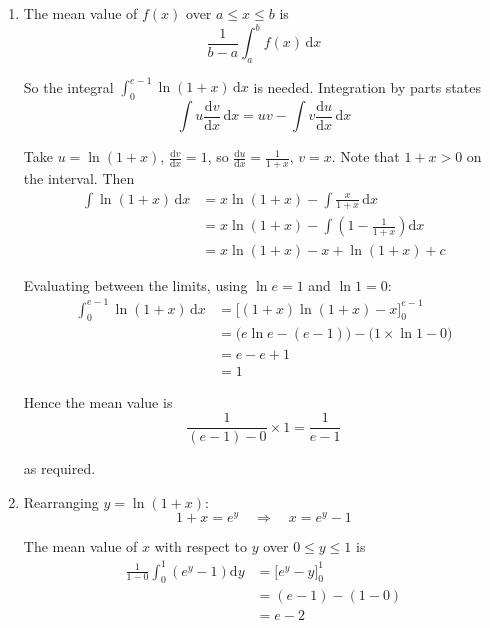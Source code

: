 \documentclass[leqno]{article}
\begin{document}
\begin{enumerate}[
  label=\textbf{\arabic*.},
  leftmargin=*,
  topsep=0pt,
  partopsep=0pt,
  parsep=0pt
]
\vspace*{10pt}

\begin{djsSolution}
\begin{enumerate}[label=\textbf{(\alph*)}, start=1]
  \item The mean value of \(f(x)\) over \(a\le x\le b\) is
\[
\dfrac{1}{b-a}\int_a^b f(x)\,\mathrm{d}x
\]

So the integral \(\int_0^{e-1}\ln(1+x)\,\mathrm{d}x\) is needed. Integration by parts states
\[
\displaystyle\int u\frac{\mathrm{d}v}{\mathrm{d}x}\,\mathrm{d}x = uv - \int v\frac{\mathrm{d}u}{\mathrm{d}x}\,\mathrm{d}x
\]

Take \(u=\ln(1+x)\), \(\frac{\mathrm{d}v}{\mathrm{d}x}=1\), so \(\frac{\mathrm{d}u}{\mathrm{d}x}=\frac{1}{1+x}\), \(v=x\). Note that \(1+x>0\) on the interval. Then
\begin{align*}
\int \ln(1+x)\,\mathrm{d}x &= x\ln(1+x)-\int\frac{x}{1+x}\,\mathrm{d}x\\
&= x\ln(1+x)-\int\left(1-\frac{1}{1+x}\right)\mathrm{d}x\\
&= x\ln(1+x)-x+\ln(1+x)+c
\end{align*}

Evaluating between the limits, using \(\ln e=1\) and \(\ln 1=0\):
\begin{align*}
\int_0^{e-1}\ln(1+x)\,\mathrm{d}x &= \Big[(1+x)\ln(1+x)-x\Big]_0^{e-1}\\
&= \big(e\ln e-(e-1)\big)-\big(1\times\ln 1-0\big)\\
&= e-e+1\\
&= 1
\end{align*}

Hence the mean value is
\[
\frac{1}{(e-1)-0}\times 1=\frac{1}{e-1}
\]

as required.

  \item Rearranging \(y=\ln(1+x)\):
\[
1+x=e^{y}\quad\Longrightarrow\quad x=e^{y}-1
\]

The mean value of \(x\) with respect to \(y\) over \(0\le y\le 1\) is
\begin{align*}
\frac{1}{1-0}\int_0^1\left(e^{y}-1\right)\mathrm{d}y &= \Big[e^{y}-y\Big]_0^1\\
&= (e-1)-(1-0)\\
&= e-2
\end{align*}

\end{enumerate}
\end{djsSolution}


\end{enumerate}
\end{document}
